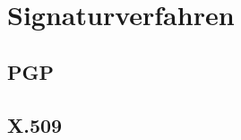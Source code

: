 \chapter{Signaturverfahren}
\label{chp:Signaturverfahren}

\section{PGP}
%
\label{sec:Signaturverfahren:pgp}%

\section{X.509}
%
\label{sec:Signaturverfahren:x509}%
